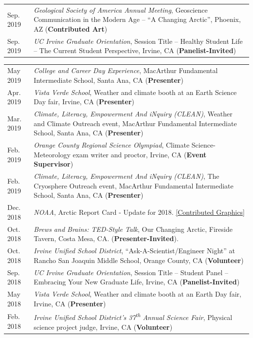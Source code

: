 \documentclass[margin,line,palatino,courier,10pt]{res}
\begin{document}
\begin{resume}
\begin{tabular}{@{}p{0.9in}p{4in}}
Sep. 2019 & \textit{Geological Society of America Annual Meeting}, Geoscience Communication in the Modern Age -- ``A Changing Arctic'', Phoenix, AZ (\textbf{Contributed Art})\\
Sep. 2019 & \textit{UC Irvine Graduate Orientation}, Session Title -- Healthy Student Life -- The Current Student Perspective, Irvine, CA (\textbf{Panelist-Invited})\\
\end{tabular}
\begin{tabular}{@{}p{0.9in}p{4in}}
May 2019 & \textit{College and Career Day Experience}, MacArthur Fundamental Intermediate School, Santa Ana, CA (\textbf{Presenter})\\
Apr. 2019 & \textit{Vista Verde School}, Weather and climate booth at an Earth Science Day fair, Irvine, CA (\textbf{Presenter})\\
Mar. 2019 & \textit{Climate, Literacy, Empowerment And iNquiry (CLEAN)}, Weather and Climate Outreach event, MacArthur Fundamental Intermediate School, Santa Ana, CA (\textbf{Presenter})\\
Feb. 2019 & \textit{Orange County Regional Science Olympiad}, Climate Science-Meteorology exam writer and proctor, Irvine, CA (\textbf{Event Supervisor})\\
Feb. 2019 & \textit{Climate, Literacy, Empowerment And iNquiry (CLEAN)}, The Cryosphere Outreach event, MacArthur Fundamental Intermediate School, Santa Ana, CA (\textbf{Presenter})\\
Dec. 2018 & \textit{NOAA}, Arctic Report Card - Update for 2018. \href{https://www.youtube.com/watch?v=XntO9a-NpeM}{[Contributed Graphics]}\\
Oct. 2018 & \textit{Brews and Brains: TED-Style Talk}, Our Changing Arctic, Fireside Tavern, Costa Mesa, CA. (\textbf{Presenter-Invited}).\\
Oct. 2018 & \textit{Irvine Unified School District}, ``Ask-A-Scientist/Engineer Night'' at Rancho San Joaquin Middle School, Orange County, CA (\textbf{Volunteer})\\
Sep. 2018 & \textit{UC Irvine Graduate Orientation}, Session Title -- Student Panel -- Embracing Your New Graduate Life, Irvine, CA (\textbf{Panelist-Invited})\\
May 2018 & \textit{Vista Verde School}, Weather and climate booth at an Earth Day fair, Irvine, CA (\textbf{Presenter})\\
Feb. 2018 & \textit{Irvine Unified School District's 37\textsuperscript{th} Annual Science Fair}, Physical science project judge, Irvine, CA (\textbf{Volunteer})\\

\end{tabular}
\end{resume}
\end{document}
